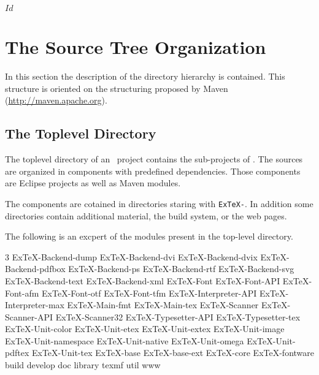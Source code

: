 \SVN$Id$
\chapter{The Source Tree Organization}

In this section the description of the directory hierarchy is
contained. This structure is oriented on the structuring proposed by
Maven (\url{http://maven.apache.org}).


\section{The Toplevel Directory}

The toplevel directory of an \ExTeX\ project contains the sub-projects
of \ExTeX. The sources are organized in components with predefined
dependencies. Those components are Eclipse projects as well as Maven
modules.

The components are cotained in directories staring with
\texttt{ExTeX-}. In addition some directories contain additional
material, the build system, or the web pages.

The following is an excpert of the modules present in the top-level
directory.

{
\begin{multicols}3 \footnotesize\sf\obeylines
  ExTeX-Backend-dump
  ExTeX-Backend-dvi
  ExTeX-Backend-dvix
  ExTeX-Backend-pdfbox
  ExTeX-Backend-ps
  ExTeX-Backend-rtf
  ExTeX-Backend-svg
  ExTeX-Backend-text
  ExTeX-Backend-xml
  ExTeX-Font
  ExTeX-Font-API
  ExTeX-Font-afm
  ExTeX-Font-otf
  ExTeX-Font-tfm
  ExTeX-Interpreter-API
  ExTeX-Interpreter-max
  ExTeX-Main-fmt
  ExTeX-Main-tex
  ExTeX-Scanner
  ExTeX-Scanner-API
  ExTeX-Scanner32
  ExTeX-Typesetter-API
  ExTeX-Typesetter-tex
  ExTeX-Unit-color
  ExTeX-Unit-etex
  ExTeX-Unit-extex
  ExTeX-Unit-image
  ExTeX-Unit-namespace
  ExTeX-Unit-native
  ExTeX-Unit-omega
  ExTeX-Unit-pdftex
  ExTeX-Unit-tex
  ExTeX-base
  ExTeX-base-ext
  ExTeX-core
  ExTeX-fontware
  build
  develop
  doc
  library
  texmf
  util
  www
\end{multicols}
}


